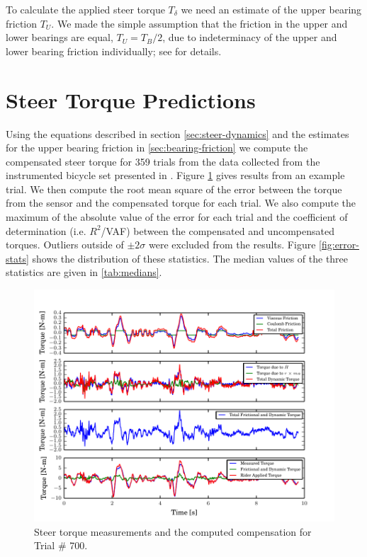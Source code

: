 \documentclass[a4paper]{article}
\begin{document}
To calculate the applied steer torque $T_\delta$ we need an estimate of the
upper bearing friction $T_U$. We made the simple assumption that the
friction in the upper and lower bearings are equal, $T_U
= T_B / 2$, due to indeterminacy of the
upper and lower bearing friction individually; see \cite{Moore2012} for details.

\section*{Steer Torque Predictions}

Using the equations described in section \ref{sec:steer-dynamics} and the
estimates for the upper bearing friction in \ref{sec:bearing-friction} we
compute the compensated steer torque for 359 trials from the data collected
from the instrumented bicycle set presented in \cite{Moore1012}. Figure
\ref{fig:steer-torque-components} gives results from an example trial. We then compute the
root mean square of the error between the torque from the sensor and the
compensated torque for each trial. We also compute the maximum of the absolute
value of the error for each trial and the coefficient of determination
(i.e. $R^2$/VAF) between the compensated and uncompensated torques. Outliers
outside of $\pm2 \sigma$ were excluded from the results. Figure
\ref{fig:error-stats} shows the distribution of these statistics.
The median values of the three statistics are given in \ref{tab:medians}.

\begin{figure}
  \includegraphics{figures/steer-torque-components.pdf}
  \caption{Steer torque measurements and the computed compensation for Trial \#
    700.}
  \label{fig:steer-torque-components}
\end{figure}
\end{document}
